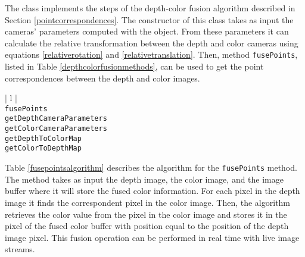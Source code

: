 The \DepthColorFusion{} class implements the steps of the depth-color fusion algorithm described in Section 
\ref{pointcorrespondences}. The constructor of this class takes as input the cameras' parameters 
computed with the \DepthColorCalibrationTool{} object. From these parameters it can calculate the relative 
transformation between the depth and color cameras using equations \eqref{relativerotation} and 
\eqref{relativetranslation}. Then, method \texttt{fuse\-Points}, listed in Table \ref{depthcolorfusionmethods},
can be used to get the point correspondences between the depth and color images.

\begin{table}[ht]
\caption{Public methods in the \DepthColorFusion{} class}
\begin{center}
\begin{tabular}{| l |}
	\hline 
	 \\
	\hline \hline
	\texttt{fusePoints} \\
	\texttt{getDepthCameraParameters} \\
	\texttt{getColorCameraParameters} \\
	\texttt{getDepthToColorMap} \\
	\texttt{getColorToDepthMap} \\
	\hline
\end{tabular}
\end{center}
\label{depthcolorfusionmethods}
\end{table}

Table \ref{fusepointsalgorithm} describes the algorithm for the \texttt{fuse\-Points} method. The method takes 
as input the depth image, the color image, and the image buffer where it will store the fused color information. 
For each pixel in the depth image it finds the correspondent pixel in the color image. Then, the algorithm 
retrieves the color value from the pixel in the color image and stores it in the pixel of the fused color buffer with 
position equal to the position of the depth image pixel. This fusion operation can be performed in real time with
live image streams.

